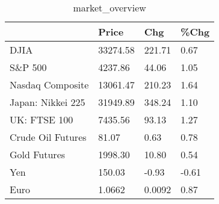 \documentclass{article}%
\begin{document}
%


\begin{table}[htbp]%
\caption{market\_overview}%
\centering%
\begin{adjustbox}{width=1\textwidth}%
\begin{tabular}{llll}
\toprule
                  &    Price &    Chg &  \%Chg \\
\midrule
             DJIA & 33274.58 & 221.71 &  0.67 \\
          S\&P 500 &  4237.86 &  44.06 &  1.05 \\
 Nasdaq Composite & 13061.47 & 210.23 &  1.64 \\
Japan: Nikkei 225 & 31949.89 & 348.24 &  1.10 \\
     UK: FTSE 100 &  7435.56 &  93.13 &  1.27 \\
Crude Oil Futures &    81.07 &   0.63 &  0.78 \\
     Gold Futures &  1998.30 &  10.80 &  0.54 \\
              Yen &   150.03 &  -0.93 & -0.61 \\
             Euro &   1.0662 & 0.0092 &  0.87 \\
\bottomrule
\end{tabular}
%
\end{adjustbox}%
\end{table}

%
\end{document}
